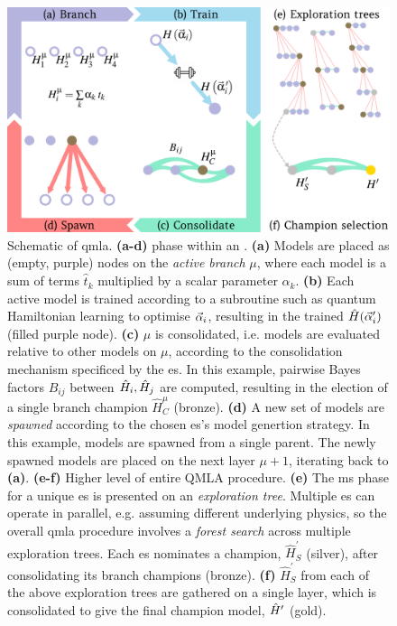 \begin{figure}[t!]
    \begin{center}
        \includegraphics{algorithms/figures/overview.jpg}
    \end{center}
    \caption[Quantum Model Learning Agent overview]{
        Schematic of \acrfull{qmla}. 
        \textbf{(a-d)}  phase within an .
        \textbf{(a)} Models are placed as (empty, purple) nodes on the \emph{active branch} $\mu$, 
            where each model is a sum of terms $\hat{t}_k$ multiplied by a scalar parameter $\alpha_k$. 
        \textbf{(b)} Each active model is trained according to a subroutine such as 
            quantum Hamiltonian learning to optimise $\vec{\alpha}_i$, 
            resulting in the trained $\hat{H}(\vec{\alpha}_i^{\prime})$ (filled purple node). 
        \textbf{(c)} $\mu$ is consolidated, i.e. models are evaluated relative to other
            models on $\mu$, according to the consolidation mechanism specificed by the \gls{es}.
            In this example, pairwise Bayes factors $B_{ij}$ between $\hat{H}_i, \hat{H}_j$ are computed, 
            resulting in the election of a single branch champion $\hat{H}_C^{\mu}$ (bronze). 
        \textbf{(d)} A new set of models are \emph{spawned} according to the chosen
            \gls{es}'s model genertion strategy.
            In this example, models are spawned from a single parent. 
            The newly spawned models are placed on the next layer $\mu+1$, 
            iterating back to \textbf{(a)}.
        \textbf{(e-f)} Higher level of entire QMLA procedure.
        \textbf{(e)} The \gls{ms} phase for a unique \gls{es} is presented on an \emph{exploration tree}. 
            Multiple \gls{es} can operate in parallel, e.g. assuming different underlying physics, 
            so the overall \gls{qmla} procedure involves a \emph{forest search} across multiple exploration trees.
            Each \gls{es} nominates a champion, $\hat{H}_{S}^{\prime}$ (silver), 
            after consolidating its branch champions (bronze). 
        \textbf{(f)} $\hat{H}_{S}^{\prime}$ from each of the above exploration trees are gathered on a single layer, 
            which is consolidated to give the final champion model, $\hat{H}^{\prime}$ (gold). 
    }
    \label{fig:qmla_overview}
\end{figure}

